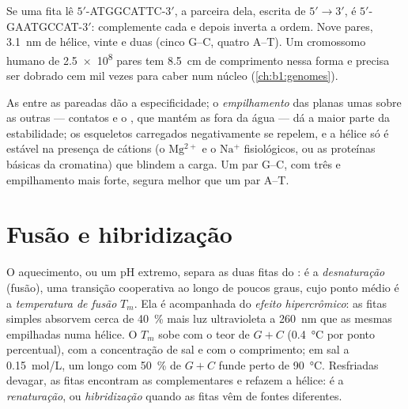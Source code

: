 \begin{example}\label{ex:b1:nucleic-acids:complement}
Se uma fita lê $5'$-ATGGCATTC-$3'$, a parceira dela, escrita de
$5' \to 3'$, é $5'$-GAATGCCAT-$3'$: complemente cada  e depois
inverta a ordem. Nove pares, \qty{3.1}{nm} de hélice, vinte e duas
 (cinco G--C, quatro A--T). Um cromossomo humano
de \num{2.5e8} pares tem \qty{8.5}{cm} de comprimento nessa forma e
precisa ser dobrado cem mil vezes para caber num núcleo
(\cref{ch:b1:genomes}).
\end{example}

\begin{proposition}\label{prop:b1:nucleic-acids:stability}
As  entre as  pareadas dão a especificidade;
o \emph{empilhamento} das  planas umas
sobre as outras --- contatos  e o ,
que mantém as  fora da água --- dá a maior parte da estabilidade;
os esqueletos carregados negativamente se repelem, e a hélice só é
estável na presença de cátions (o $\mathrm{Mg^{2+}}$ e o
$\mathrm{Na^+}$ fisiológicos, ou as proteínas básicas da cromatina) que
blindem a carga. Um par G--C, com três  e
empilhamento mais forte, segura melhor que um par A--T.
\end{proposition}

\section{Fusão e hibridização}

\begin{definition}\label{def:b1:nucleic-acids:melting}
O aquecimento, ou um pH extremo, separa as duas fitas do : é a
\emph{desnaturação} (fusão), uma transição
cooperativa ao longo de poucos graus, cujo ponto médio é a
\emph{temperatura de fusão} $T_m$. Ela é
acompanhada do \emph{efeito hipercrômico}: as fitas simples absorvem
cerca de \qty{40}{\%} mais luz ultravioleta a \qty{260}{nm} que as
mesmas  empilhadas numa hélice. O $T_m$ sobe com o teor de $G + C$
(\qty{0.4}{\celsius} por ponto percentual), com a concentração de sal e
com o comprimento; em sal a \qty{0.15}{mol/L}, um  longo com
\qty{50}{\%} de $G + C$ funde perto de \qty{90}{\celsius}. Resfriadas
devagar, as fitas encontram as complementares e refazem a hélice: é a
\emph{renaturação}, ou \emph{hibridização} quando as
fitas vêm de fontes diferentes.
\end{definition}

